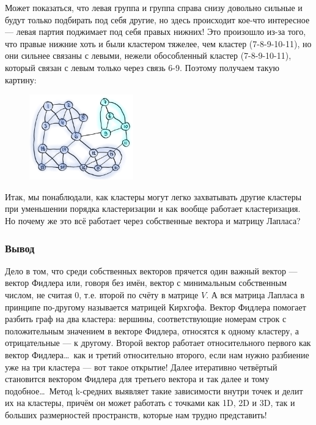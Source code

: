 \documentclass[a3paper,14pt]{extarticle}
\begin{document}
Может показаться, что левая группа и группа справа снизу довольно сильные и будут только подбирать под себя другие, но здесь происходит кое-что интересное --- левая партия поджимает под себя правых нижних! Это произошло из-за того, что правые нижние хоть и были кластером тяжелее, чем кластер (7-8-9-10-11), но они сильнее связаны с левыми, нежели обособленный кластер (7-8-9-10-11), который связан с левым только через связь 6-9. Поэтому получаем такую картину:
\begin{figure}[h]
    \centering\includegraphics[width=0.4\textwidth]{1(2).png}
\end{figure}

\pagebreak\noindent Итак, мы понаблюдали, как кластеры могут легко захватывать другие кластеры при уменьшении порядка кластеризации и как вообще работает кластеризация. Но почему же это всё работает через собственные вектора и матрицу Лапласа?
\subsubsection*{\centering Вывод}
Дело в том, что среди собственных векторов прячется один важный вектор --- вектор Фидлера или, говоря без имён, вектор с минимальным собственным числом, не считая 0, т.е. второй по счёту в матрице $V$. А вся матрица Лапласа в принципе по-другому называется матрицей Кирхгофа. Вектор Фидлера помогает разбить граф на два кластера: вершины, соответствующие номерам строк с положительным значением в векторе Фидлера, относятся к одному кластеру, а отрицательные --- к другому. Второй вектор работает относительного первого как вектор Фидлера\dots\ как и третий относительно второго, если нам нужно разбиение уже на три кластера --- вот такое открытие! Далее итеративно четвёртый становится вектором Фидлера для третьего вектора и так далее и тому подобное\dots\ Метод k-средних выявляет такие зависимости внутри точек и делит их на кластеры, причём он может работать с точками как 1D, 2D и 3D, так и больших размерностей пространств, которые нам трудно представить!
\end{document}
